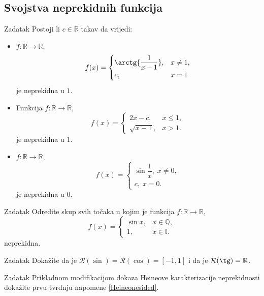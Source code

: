 \subsection*{Svojstva neprekidnih funkcija}
\begin{exercise}{Zadatak}
Postoji li \(c\in \mathbb{R}\) takav da vrijedi:
\begin{itemize}
\item[a)] \(f : \mathbb{R}\to \mathbb{R}\), \[f(x)=\begin{cases}
\arctg{\dfrac{1}{x-1}},& x\neq 1,\\
c, & x=1
\end{cases}\] 
je neprekidna u \(1\).
\item[b)] Funkcija \(f : \mathbb{R}\to \mathbb{R}\), \[f(x)=\begin{cases}
2x-c,& x\leq 1,\\
\sqrt{x-1},& x>1.
\end{cases}\]
je neprekidna u \(1\).
\item[b)] \(f : \mathbb{R}\to \mathbb{R}\), \[f(x)=\begin{cases}
\sin{\dfrac{1}{x}},\; x\neq 0,\\
c,\; x=0.
\end{cases}\]
je neprekidna u \(0\).
\end{itemize}
\end{exercise}
\begin{exercise}{Zadatak}
Odredite skup svih točaka u kojim je funkcija \(f : \mathbb{R}\to \mathbb{R}\),
\[f(x)=\begin{cases}
\sin{x},& x\in \mathbb{Q},\\
1,& x\in \mathbb{I}.
\end{cases}\]
neprekidna.
\end{exercise}
\begin{exercise}{Zadatak}
Dokažite da je \(\mathcal{R}(\sin)=\mathcal{R}(\cos)=[-1, 1]\) i da je \(\mathcal{R}(\tg)=\mathbb{R}\).
\end{exercise}
\begin{exercise}{Zadatak}
Prikladnom modifikacijom dokaza Heineove karakterizacije neprekidnosti dokažite prvu tvrdnju napomene \ref{Heineonesided}.
\end{exercise}
